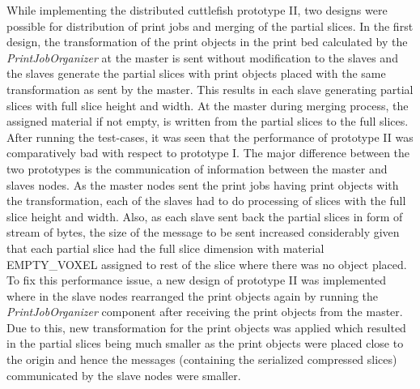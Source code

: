 While implementing the distributed cuttlefish prototype II, two designs were possible for distribution of print jobs and merging of the partial slices. In the first design, the transformation of the print objects in the print bed calculated by the \textit{PrintJobOrganizer} at the master is sent without modification to the slaves and the slaves generate the partial slices with print objects placed with the same transformation as sent by the master. This results in each slave generating partial slices with full slice height and width. At the master during merging process, the assigned material if not empty, is written from the partial slices to the full slices. After running the test-cases, it was seen that the performance of prototype II was comparatively bad with respect to prototype I. The major difference between the two prototypes is the communication of information between the master and slaves nodes. As the master nodes sent the print jobs having  print objects with the transformation, each of the slaves had to do processing of slices with the full slice height and width. Also, as each slave sent back the partial slices in form of stream of bytes, the size of the message to be sent increased considerably given that each partial slice had the full slice dimension with material EMPTY\_VOXEL assigned to rest of the slice where there was no object placed.  To fix this performance issue, a new design of prototype II was implemented where in the slave nodes rearranged the print objects again by running the \textit{PrintJobOrganizer} component after receiving the print objects from the master. Due to this, new transformation for the print objects was applied which resulted in the partial slices being much smaller as the print objects were placed close to the origin and hence the messages (containing the serialized compressed slices) communicated by the slave nodes were smaller. \newline


